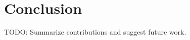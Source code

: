 \section{Conclusion}
\label{sec:conclusion}

TODO: Summarize contributions and suggest future work.

